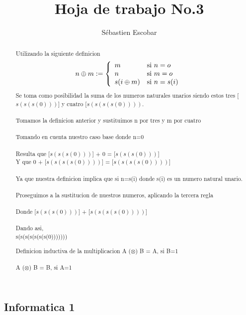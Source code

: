 \documentclass[12pt,letterpaper,twocolumn]{article}
\begin{document}
\title{Hoja de trabajo No.3}
\author{Sébastien Escobar}
\maketitle

\subsection*{Informatica 1}
\renewcommand{\abstractname}{Ejercicio No.1 }
\begin{abstract}
Utilizando la siguiente definicion 
\[
        n\oplus m := \left\{
        \begin{array}{l l}
            m & \mbox{si } n=o \\
            n & \mbox{si } m=o \\
            s(i\oplus m) & \mbox{si } n=s(i) \\
        \end{array}
        \right.
    \]
Se toma como posibilidad la suma de los numeros naturales unarios siendo estos  tres [$s(s(s(0)))$] y cuatro [$s(s(s(s(0))))$.
\\
\\Tomamos la definicion anterior y sustituimos n por tres y m por cuatro
\\
\\Tomando en cuenta nuestro caso base donde n=0
\\
\\Resulta que  [$s(s(s(0)))$] + 0 =  [$s(s(s(0)))$]
\\Y que 0 +  [$s(s(s(s(0))))$] =  [$s(s(s(s(0))))$]
\\
\\ Ya que nuestra definicion implica que si n=s(i) donde s(i) es un numero natural unario.
\\
\\ Proseguimos a la sustitucion de nuestros numeros, aplicando la tercera regla
\\
\\Donde  [$s(s(s(0)))$] +  [$s(s(s(s(0))))$]
\\
\\Dando asi,
\\s(s(s(s(s(s(s(0)))))))

\end{abstract}

\renewcommand{\abstractname}{Ejercicio No.2}
\begin{abstract}
Definicion inductiva de la multiplicacion
A  ($\otimes$)  B = A, si B=1
\\
\\A  ($\otimes$)  B = B, si A=1


\end{abstract}

\renewcommand{\abstractname}{Ejercicio No.3}
\begin{abstract}

\end{abstract}

\renewcommand{\abstractname}{Ejercicio No.4}
\begin{abstract}

\end{abstract}
\end{document}
